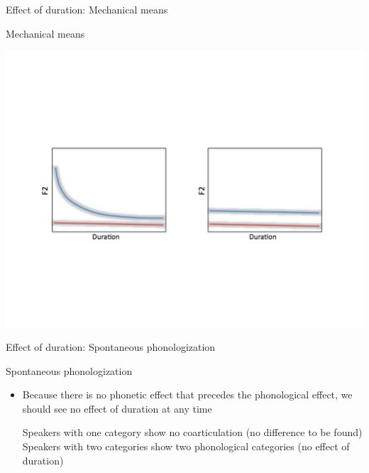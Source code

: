 \documentclass[hyperref={pdfpagelabels=false}]{beamer}
\begin{document}
\begin{frame}[noframenumbering]{Effect of duration: Mechanical means}
	\begin{block}{Mechanical means}
		\begin{center}
		\includegraphics[trim=2cm 2cm 2cm 2cm, clip=false, width=.7\textwidth]{DurationEx.pdf}
		\end{center}
	\end{block}	
\end{frame}

\begin{frame}[noframenumbering]{Effect of duration: Spontaneous phonologization}
	\begin{block}{Spontaneous phonologization}
		\begin{itemize}
			\item Because there is no phonetic effect that precedes the phonological effect, we should see no effect of duration at any time \pause
			\begin{xlist}
				\ex Speakers with one category show no coarticulation (no difference to be found) \pause
				\ex Speakers with two categories show two phonological categories (no effect of duration) 
			\end{xlist}
		\end{itemize}
	\end{block}	
\end{frame}
\end{document}
